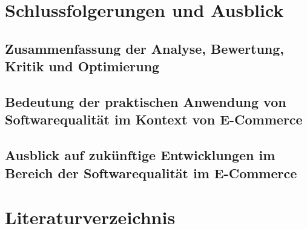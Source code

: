 \documentclass{article}
\begin{document}
\section{Schlussfolgerungen und Ausblick}
\subsection{Zusammenfassung der Analyse, Bewertung, Kritik und Optimierung}
\subsection{Bedeutung der praktischen Anwendung von Softwarequalität im Kontext von E-Commerce}
\subsection{Ausblick auf zukünftige Entwicklungen im Bereich der Softwarequalität im E-Commerce}

\section{Literaturverzeichnis}
\end{document}

